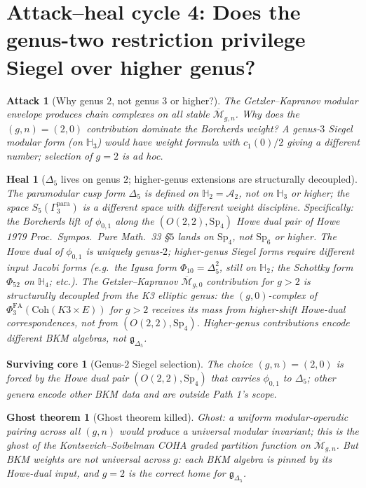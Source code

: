 \documentclass[11pt]{article}
\newtheorem{attack}[theorem]{Attack}
\newtheorem{heal}[theorem]{Heal}
\newtheorem{surviving}[theorem]{Surviving core}
\newtheorem{ghost}[theorem]{Ghost theorem}
\providecommand{\Coh}{\mathrm{Coh}}
\providecommand{\cA}{\mathcal{A}}
\providecommand{\fg}{\mathfrak{g}}
\providecommand{\HHH}{\mathbb{H}}
\providecommand{\Mbar}{\overline{\mathcal M}}
\providecommand{\PhiFA}{\Phi^{\mathrm{FA}}}
\begin{document}
\section{Attack--heal cycle 4: Does the genus-two restriction privilege Siegel over higher genus?}
\label{sec:attack-cycle-4}

\begin{attack}[Why genus $2$, not genus $3$ or higher?]
\label{att:genus-two-BL-2}
The Getzler--Kapranov modular envelope produces chain complexes on
all stable $\Mbar_{g, n}$. Why does the $(g, n) = (2, 0)$
contribution dominate the Borcherds weight? A genus-$3$ Siegel
modular form (on $\HHH_3$) would have weight formula with $c_1(0)/2$
giving a different number; selection of $g = 2$ is ad hoc.
\end{attack}

\begin{heal}[$\Delta_5$ lives on genus $2$; higher-genus extensions are structurally decoupled]
\label{heal:genus-two-BL-2}
The paramodular cusp form $\Delta_5$ is defined on $\HHH_2 = \cA_2$,
not on $\HHH_3$ or higher; the space $S_5(\Gamma_3^{\mathrm{para}})$
is a \emph{different} space with different weight discipline.
Specifically: the Borcherds lift of $\phi_{0, 1}$ along the
$(O(2, 2), \mathrm{Sp}_4)$ Howe dual pair of Howe 1979
\emph{Proc.\ Sympos.\ Pure Math.}~33 \S$5$ lands on $\mathrm{Sp}_4$,
not $\mathrm{Sp}_{6}$ or higher. The Howe dual of $\phi_{0, 1}$ is
uniquely genus-$2$; higher-genus Siegel forms require different input
Jacobi forms (e.g.\ the Igusa form $\Phi_{10} = \Delta_5^2$, still on
$\HHH_2$; the Schottky form $\Phi_{52}$ on $\HHH_4$; etc.).
The Getzler--Kapranov $\Mbar_{g, 0}$ contribution for $g > 2$ is
structurally decoupled from the K3 elliptic genus: the $(g, 0)$-complex
of $\PhiFA_3(\Coh(K3 \times E))$ for $g > 2$ receives its mass from
higher-shift Howe-dual correspondences, not from $(O(2, 2), \mathrm{Sp}_4)$.
Higher-genus contributions encode different BKM algebras, not
$\fg_{\Delta_5}$.
\end{heal}

\begin{surviving}[Genus-$2$ Siegel selection]
\label{surv:genus-two-BL-2}
The choice $(g, n) = (2, 0)$ is forced by the Howe dual pair
$(O(2, 2), \mathrm{Sp}_4)$ that carries $\phi_{0, 1}$ to $\Delta_5$;
other genera encode other BKM data and are outside Path 1's scope.
\end{surviving}

\begin{ghost}[Ghost theorem killed]
\label{ghost:genus-two-BL-2}
Ghost: a uniform modular-operadic pairing across all $(g, n)$
would produce a universal modular invariant; this is the ghost of the
Kontsevich--Soibelman COHA graded partition function on
$\Mbar_{g, n}$. But BKM weights are \emph{not} universal across $g$:
each BKM algebra is pinned by its Howe-dual input, and $g = 2$ is
the correct home for $\fg_{\Delta_5}$.
\end{ghost}
\end{document}
